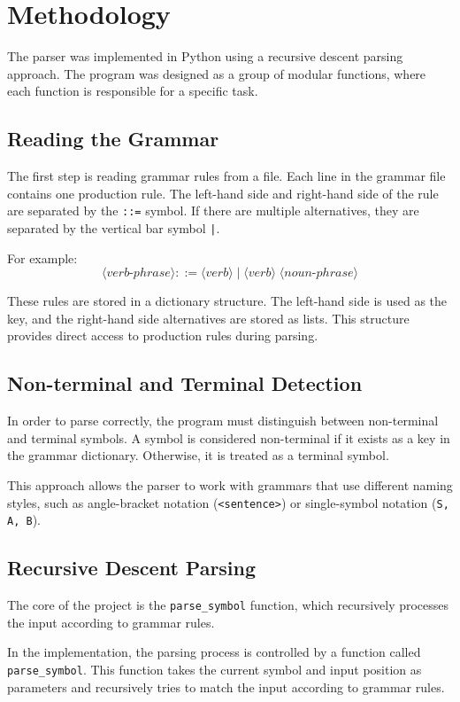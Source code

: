 \documentclass[12pt,a4paper]{article}
\begin{document}
	\section{Methodology}
	The parser was implemented in Python using a recursive descent parsing approach. The program was designed as a group of modular functions, where each function is responsible for a specific task.
	
	\subsection{Reading the Grammar}
	The first step is reading grammar rules from a file. Each line in the grammar file contains one production rule. The left-hand side and right-hand side of the rule are separated by the \texttt{::=} symbol. If there are multiple alternatives, they are separated by the vertical bar symbol \texttt{|}.
	
	For example:
	\[
	\langle verb\mbox{-}phrase \rangle ::= \langle verb \rangle \; | \; \langle verb \rangle \; \langle noun\mbox{-}phrase \rangle
	\]
	
	These rules are stored in a dictionary structure. The left-hand side is used as the key, and the right-hand side alternatives are stored as lists. This structure provides direct access to production rules during parsing.
	
	\subsection{Non-terminal and Terminal Detection}
	In order to parse correctly, the program must distinguish between non-terminal and terminal symbols. A symbol is considered non-terminal if it exists as a key in the grammar dictionary. Otherwise, it is treated as a terminal symbol.
	
	This approach allows the parser to work with grammars that use different naming styles, such as angle-bracket notation (\texttt{<sentence>}) or single-symbol notation (\texttt{S, A, B}).
	
	\subsection{Recursive Descent Parsing}
	The core of the project is the \texttt{parse\_symbol} function, which recursively processes the input according to grammar rules.
	
	In the implementation, the parsing process is controlled by a function called \texttt{parse\_symbol}. This function takes the current symbol and input position as parameters and recursively tries to match the input according to grammar rules.
	
\end{document}
